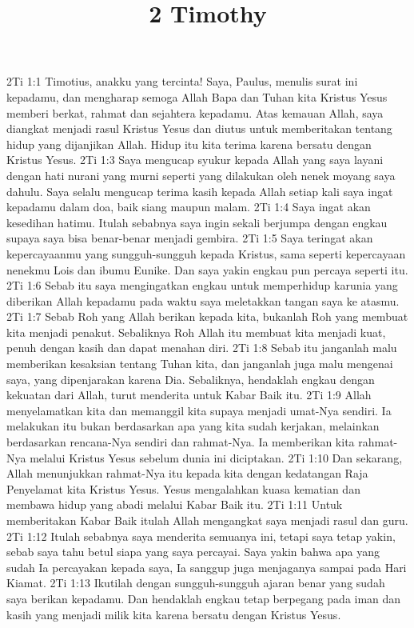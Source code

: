 

\title{2 Timothy}
2Ti 1:1  Timotius, anakku yang tercinta! Saya, Paulus, menulis surat ini kepadamu, dan mengharap semoga Allah Bapa dan Tuhan kita Kristus Yesus memberi berkat, rahmat dan sejahtera kepadamu. Atas kemauan Allah, saya diangkat menjadi rasul Kristus Yesus dan diutus untuk memberitakan tentang hidup yang dijanjikan Allah. Hidup itu kita terima karena bersatu dengan Kristus Yesus.
2Ti 1:3  Saya mengucap syukur kepada Allah yang saya layani dengan hati nurani yang murni seperti yang dilakukan oleh nenek moyang saya dahulu. Saya selalu mengucap terima kasih kepada Allah setiap kali saya ingat kepadamu dalam doa, baik siang maupun malam.
2Ti 1:4  Saya ingat akan kesedihan hatimu. Itulah sebabnya saya ingin sekali berjumpa dengan engkau supaya saya bisa benar-benar menjadi gembira.
2Ti 1:5  Saya teringat akan kepercayaanmu yang sungguh-sungguh kepada Kristus, sama seperti kepercayaan nenekmu Lois dan ibumu Eunike. Dan saya yakin engkau pun percaya seperti itu.
2Ti 1:6  Sebab itu saya mengingatkan engkau untuk memperhidup karunia yang diberikan Allah kepadamu pada waktu saya meletakkan tangan saya ke atasmu.
2Ti 1:7  Sebab Roh yang Allah berikan kepada kita, bukanlah Roh yang membuat kita menjadi penakut. Sebaliknya Roh Allah itu membuat kita menjadi kuat, penuh dengan kasih dan dapat menahan diri.
2Ti 1:8  Sebab itu janganlah malu memberikan kesaksian tentang Tuhan kita, dan janganlah juga malu mengenai saya, yang dipenjarakan karena Dia. Sebaliknya, hendaklah engkau dengan kekuatan dari Allah, turut menderita untuk Kabar Baik itu.
2Ti 1:9  Allah menyelamatkan kita dan memanggil kita supaya menjadi umat-Nya sendiri. Ia melakukan itu bukan berdasarkan apa yang kita sudah kerjakan, melainkan berdasarkan rencana-Nya sendiri dan rahmat-Nya. Ia memberikan kita rahmat-Nya melalui Kristus Yesus sebelum dunia ini diciptakan.
2Ti 1:10  Dan sekarang, Allah menunjukkan rahmat-Nya itu kepada kita dengan kedatangan Raja Penyelamat kita Kristus Yesus. Yesus mengalahkan kuasa kematian dan membawa hidup yang abadi melalui Kabar Baik itu.
2Ti 1:11  Untuk memberitakan Kabar Baik itulah Allah mengangkat saya menjadi rasul dan guru.
2Ti 1:12  Itulah sebabnya saya menderita semuanya ini, tetapi saya tetap yakin, sebab saya tahu betul siapa yang saya percayai. Saya yakin bahwa apa yang sudah Ia percayakan kepada saya, Ia sanggup juga menjaganya sampai pada Hari Kiamat.
2Ti 1:13  Ikutilah dengan sungguh-sungguh ajaran benar yang sudah saya berikan kepadamu. Dan hendaklah engkau tetap berpegang pada iman dan kasih yang menjadi milik kita karena bersatu dengan Kristus Yesus.
